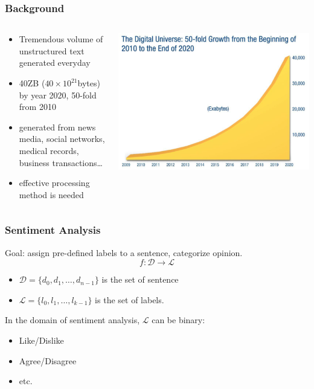 \documentclass{beamer}
\begin{document}
\begin{frame}
\frametitle{Background}
    \begin{columns}
    \begin{column}{0.5\textwidth}
    \begin{itemize}
        \item Tremendous volume of unstructured text generated everyday
        \item 40ZB ($40\times 10^{21}$bytes) by year 2020, 50-fold from 2010\footnotemark
        \item generated from news media, social networks, medical records, 
            business transactions\ldots
        \item effective processing method is needed
    \end{itemize}
    \end{column}
    \begin{column}{0.5\textwidth}
    \center\includegraphics[width=\textwidth]{figure/data_growth_2020}
    \end{column}
    \end{columns}
\end{frame}

\begin{frame}
\frametitle{Sentiment Analysis}
    Goal: assign pre-defined labels to a sentence, categorize opinion.
    $$f:\mathcal{D}\rightarrow\mathcal{L}$$
    \begin{itemize}
        \item $\mathcal{D}=\{d_0, d_1,\ldots, d_{n-1}\}$ is the set of sentence
        \item $\mathcal{L}=\{l_0, l_1,\ldots, l_{k-1}\}$ is the set of labels.
    \end{itemize}
    In the domain of sentiment analysis, $\mathcal{L}$ can be binary:
    \begin{itemize}
    \item Like/Dislike
    \item Agree/Disagree
    \item etc.
    \end{itemize}
\end{frame}
\end{document}
